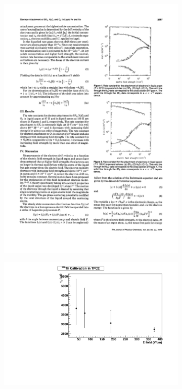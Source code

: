 \documentclass[herrin-thesis.tex]{subfiles}
\begin{document}
\begin{figure}[tbp]
\centering
\begin{subfigure}[b]{0.35\linewidth}
\includegraphics[width=\textwidth]{./plots/el_attachment_vs_efield.pdf}
\end{subfigure}\hspace{0.05\linewidth}%
\begin{subfigure}[b]{0.55\linewidth}
\includegraphics[width=\textwidth]{./plots/el_lifetime_vs_efield.pdf}

\end{subfigure}
\end{figure}
\end{document}

